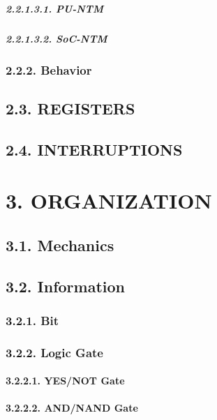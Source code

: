 \documentclass[]{article}
\let\oldparagraph\paragraph
\renewcommand{\paragraph}[1]{\oldparagraph{#1}\mbox{}}
\let\oldsubparagraph\subparagraph
\renewcommand{\subparagraph}[1]{\oldsubparagraph{#1}\mbox{}}
\begin{document}
\subparagraph{2.2.1.3.1. PU-NTM}\label{pu-ntm-2}

\subparagraph{2.2.1.3.2. SoC-NTM}\label{soc-ntm-2}

\subsubsection{2.2.2. Behavior}\label{behavior}

\subsection{2.3. REGISTERS}\label{registers}

\subsection{2.4. INTERRUPTIONS}\label{interruptions}

\section{3. ORGANIZATION}\label{organization}

\subsection{3.1. Mechanics}\label{mechanics}

\subsection{3.2. Information}\label{information}

\subsubsection{3.2.1. Bit}\label{bit}

\subsubsection{3.2.2. Logic Gate}\label{logic-gate}

\paragraph{3.2.2.1. YES/NOT Gate}\label{yesnot-gate}

\paragraph{3.2.2.2. AND/NAND Gate}\label{andnand-gate}
\end{document}
